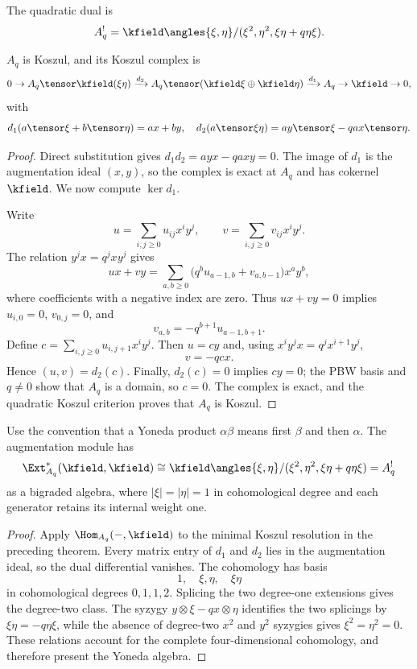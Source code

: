 The quadratic dual is
\[
 A_q^!=\kfield\angles{\xi,\eta}/(\xi^2,\eta^2,\xi\eta+q\eta\xi).
\]

\begin{theorem}[Koszulness]
$A_q$ is Koszul, and its Koszul complex is
\[
 0\to A_q\tensor\kfield(\xi\eta)
 \xrightarrow{d_2}
 A_q\tensor(\kfield\xi\oplus\kfield\eta)
 \xrightarrow{d_1}A_q\to\kfield\to0,
\]
with
\[
 d_1(a\tensor\xi+b\tensor\eta)=ax+by,
\quad
 d_2(a\tensor\xi\eta)=ay\tensor\xi-qax\tensor\eta.
\]
\end{theorem}
\begin{proof}
Direct substitution gives $d_1d_2=ayx-qaxy=0$. The image of $d_1$ is the augmentation ideal $(x,y)$, so the complex is exact at $A_q$ and has cokernel $\kfield$. We now compute $\ker d_1$.

Write
\[
 u=\sum_{i,j\ge0}u_{ij}x^iy^j,
 \qquad
 v=\sum_{i,j\ge0}v_{ij}x^iy^j.
\]
The relation $y^jx=q^jxy^j$ gives
\[
 ux+vy=\sum_{a,b\ge0}
 \bigl(q^b u_{a-1,b}+v_{a,b-1}\bigr)x^ay^b,
\]
where coefficients with a negative index are zero. Thus $ux+vy=0$ implies $u_{i,0}=0$, $v_{0,j}=0$, and
\[
 v_{a,b}=-q^{b+1}u_{a-1,b+1}.
\]
Define $c=\sum_{i,j\ge0}u_{i,j+1}x^iy^j$. Then $u=cy$ and, using $x^iy^jx=q^jx^{i+1}y^j$,
\[
 v=-qcx.
\]
Hence $(u,v)=d_2(c)$. Finally, $d_2(c)=0$ implies $cy=0$; the PBW basis and $q\ne0$ show that $A_q$ is a domain, so $c=0$. The complex is exact, and the quadratic Koszul criterion proves that $A_q$ is Koszul.
\end{proof}

\begin{theorem}
Use the convention that a Yoneda product $\alpha\beta$ means first $\beta$ and then $\alpha$. The augmentation module has
\[
 \Ext^*_{A_q}(\kfield,\kfield)
 \cong
 \kfield\angles{\xi,\eta}/(\xi^2,\eta^2,\xi\eta+q\eta\xi)
 =A_q^!
\]
as a bigraded algebra, where $|\xi|=|\eta|=1$ in cohomological degree and each generator retains its internal weight one.
\end{theorem}
\begin{proof}
Apply $\Hom_{A_q}(-,\kfield)$ to the minimal Koszul resolution in the preceding theorem. Every matrix entry of $d_1$ and $d_2$ lies in the augmentation ideal, so the dual differential vanishes. The cohomology has basis
\[
 1,\quad \xi,\eta,\quad \xi\eta
\]
in cohomological degrees $0,1,1,2$. Splicing the two degree-one extensions gives the degree-two class. The syzygy $y\otimes\xi-qx\otimes\eta$ identifies the two splicings by
$\xi\eta=-q\eta\xi$, while the absence of degree-two $x^2$ and $y^2$ syzygies gives $\xi^2=\eta^2=0$. These relations account for the complete four-dimensional cohomology, and therefore present the Yoneda algebra.
\end{proof}


